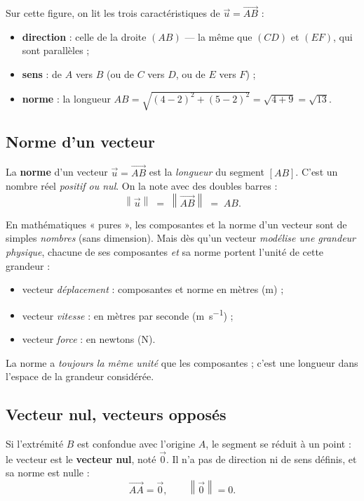 \documentclass[11pt,a4paper]{article}
\newcommand{\vc}[1]{\overrightarrow{#1}}        %
\providecommand{\norm}[1]{\left\lVert #1\right\rVert}
\begin{document}
Sur cette figure, on lit les trois caractéristiques de $\vec{u}=\vc{AB}$ :
\begin{itemize}[leftmargin=1.6em,topsep=2pt,itemsep=1pt]
  \item \textbf{direction} : celle de la droite $(AB)$ — la même que $(CD)$ et $(EF)$, qui sont parallèles ;
  \item \textbf{sens} : de $A$ vers $B$ (ou de $C$ vers $D$, ou de $E$ vers $F$) ;
  \item \textbf{norme} : la longueur $AB=\sqrt{(4-2)^2+(5-2)^2}=\sqrt{4+9}=\sqrt{13}$.
\end{itemize}

\subsection{Norme d'un vecteur}

\begin{definition}[norme]
La \textbf{norme} d'un vecteur $\vec{u}=\vc{AB}$ est la \emph{longueur} du segment $[AB]$. C'est un
nombre réel \emph{positif ou nul}. On la note avec des doubles barres :
\[
  \norm{\vec{u}} \;=\; \norm{\vc{AB}} \;=\; AB .
\]
\end{definition}

\begin{remarque}
En mathématiques « pures », les composantes et la norme d'un vecteur sont de simples \emph{nombres}
(sans dimension). Mais dès qu'un vecteur \emph{modélise une grandeur physique}, chacune de ses
composantes \emph{et} sa norme portent l'unité de cette grandeur :
\begin{itemize}[leftmargin=1.6em,topsep=2pt,itemsep=1pt]
  \item vecteur \emph{déplacement} : composantes et norme en mètres (\unit{\m}) ;
  \item vecteur \emph{vitesse} : en mètres par seconde (\unit{\m\per\s}) ;
  \item vecteur \emph{force} : en newtons (\unit{\N}).
\end{itemize}
La norme a \emph{toujours la même unité} que les composantes ; c'est une longueur dans l'espace de
la grandeur considérée.
\end{remarque}

\subsection{Vecteur nul, vecteurs opposés}

\begin{definition}
Si l'extrémité $B$ est confondue avec l'origine $A$, le segment se réduit à un point : le vecteur est
le \textbf{vecteur nul}, noté $\vec{0}$. Il n'a pas de direction ni de sens définis, et sa norme est nulle :
\[
  \vc{AA}=\vec{0}, \qquad \norm{\vec{0}}=0 .
\]
\end{definition}
\end{document}
